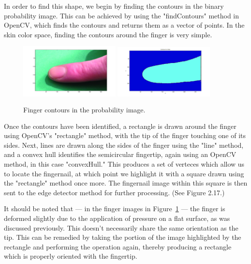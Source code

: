 In order to find this shape, we begin by finding the contours in the binary probability image. This can be achieved by using the "findContours" method in OpenCV, which finds the contours and returns them as a vector of points. In the skin color space, finding the contours around the finger is very simple.

\begin{figure}[h!]
  \centering
      \includegraphics[width=0.45\textwidth]{Chapter4/Figs/imgJIndex1.jpg}
    \includegraphics[width=0.45\textwidth]{Chapter4/Figs/indexContours.jpg}
    \caption{Finger contours in the probability image.}\label{fig:IndexContours}
\end{figure}

Once the contours have been identified, a rectangle is drawn around the finger using OpenCV's "rectangle" method, with the tip of the finger touching one of its sides. Next, lines are drawn along the sides of the finger using the "line" method, and a convex hull identifies the semicircular fingertip, again using an OpenCV method, in this case "convexHull." This produces a set of verteces which allow us to locate the fingernail, at which point we highlight it with a square drawn using the "rectangle" method once more. The fingernail image within this square is then sent to the edge detector method for further processing. (See Figure 2.17.)

It should be noted that --- in the finger images in Figure~\ref{fig:IndexContours} --- the finger is deformed slightly due to the application of pressure on a flat surface, as was discussed previously. This doesn't necessarily share the same orientation as the tip. This can be remedied by taking the portion of the image highlighted by the rectangle and performing the operation again, thereby producing a rectangle which is properly oriented with the fingertip.

